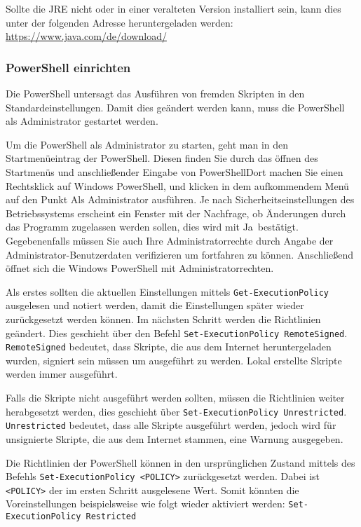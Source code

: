 Sollte die JRE nicht oder in einer veralteten Version installiert sein, kann dies unter der folgenden Adresse heruntergeladen werden:
\newline
\url{https://www.java.com/de/download/}

\subsubsection*{PowerShell einrichten}
Die PowerShell untersagt das Ausführen von fremden Skripten in den Standardeinstellungen. Damit dies geändert werden kann, muss die PowerShell als Administrator gestartet werden.

Um die PowerShell als Administrator zu starten, geht man in den Startmenüeintrag der PowerShell. Diesen finden Sie durch das öffnen des Startmenüs und anschließender Eingabe von \glqq PowerShell\grqq Dort machen Sie einen Rechtsklick auf \glqq Windows PowerShell\grqq , und klicken in dem aufkommendem Menü auf den Punkt \glqq Als Administrator ausführen\grqq. Je nach Sicherheitseinstellungen des Betriebssystems erscheint ein Fenster mit der Nachfrage, ob Änderungen durch das Programm zugelassen werden sollen, dies wird mit \glqq Ja\grqq\ bestätigt. Gegebenenfalls müssen Sie auch Ihre Administratorrechte durch Angabe der Administrator-Benutzerdaten verifizieren um fortfahren zu können. Anschließend öffnet sich die Windows PowerShell mit Administratorrechten.

Als erstes sollten die aktuellen Einstellungen mittels \lstinline{Get-ExecutionPolicy} ausgelesen und notiert werden, damit die Einstellungen später wieder zurückgesetzt werden können. Im nächsten Schritt werden die Richtlinien geändert. Dies geschieht über den Befehl \lstinline{Set-ExecutionPolicy RemoteSigned}. \lstinline{RemoteSigned} bedeutet, dass Skripte, die aus dem Internet heruntergeladen wurden, signiert sein müssen um ausgeführt zu werden. Lokal erstellte Skripte werden immer ausgeführt.

Falls die Skripte nicht ausgeführt werden sollten, müssen die Richtlinien weiter herabgesetzt werden, dies geschieht über \lstinline{Set-ExecutionPolicy Unrestricted}. \lstinline{Unrestricted} bedeutet, dass alle Skripte ausgeführt werden, jedoch wird für unsignierte Skripte, die aus dem Internet stammen, eine Warnung ausgegeben.

Die Richtlinien der PowerShell können in den ursprünglichen Zustand mittels des Befehls \lstinline{Set-ExecutionPolicy <POLICY>} zurückgesetzt werden. Dabei ist \lstinline{<POLICY>} der im ersten Schritt ausgelesene Wert. Somit könnten die Voreinstellungen beispielsweise wie folgt wieder aktiviert werden: \lstinline{Set-ExecutionPolicy Restricted}


